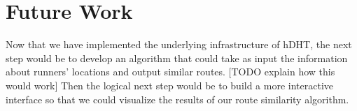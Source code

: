 \section{Future Work} \label{section:future-work}
Now that we have implemented the underlying infrastructure of hDHT, the next step would be to develop an algorithm that could take as input the information about runners' locations and output similar routes. [TODO explain how this would work] Then the logical next step would be to build a more interactive interface so that we could visualize the results of our route similarity algorithm.